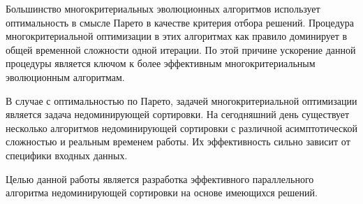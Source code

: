 \startprefacepage
Большинство многокритериальных эволюционных алгоритмов использует оптимальность в смысле Парето в качестве критерия отбора решений. Процедура многокритериальной оптимизации в этих алгоритмах как правило доминирует в общей временной сложности одной итерации. По этой причине ускорение данной процедуры является ключом к более эффективным многокритериальным эволюционным алгоритмам.

В случае с оптимальностью по Парето, задачей многокритериальной оптимизации является задача недоминирующей сортировки. На сегодняшний день существует несколько алгоритмов недоминирующей сортировки с различной асимптотической сложностью и реальным временем работы. Их эффективность сильно зависит от специфики входных данных.
 
Целью данной работы является разработка эффективного параллельного алгоритма недоминирующей сортировки на основе имеющихся решений.
